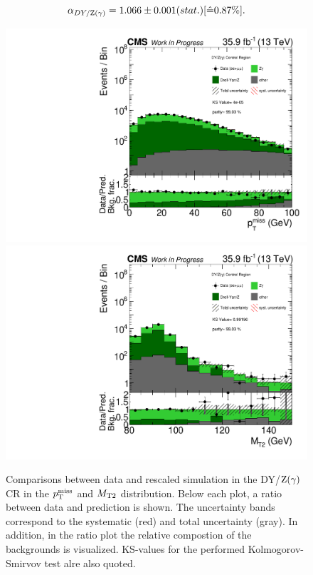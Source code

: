 %
\begin{equation}\label{eq:AlphaDY}
 \alpha_{DY/\mathrm{Z}(\gamma)}=1.066 \pm 0.001 (stat.) [\hat{=}0.87\%].
\end{equation}

\begin{figure}[tbp]
 \centering
 \includegraphics[width=\pairwidth]{figures/plots_CR_dy/CRDY_LL_nom_met_log}
 \includegraphics[width=\pairwidth]{figures/plots_CR_dy/CRDY_LL_nom_mt2_log}
 \caption{Comparisons between data and rescaled simulation in the DY/$\mathrm{Z}(\gamma)$ CR in the $p_{\mathrm{T}}^\text{miss}$ and $M_{\mathrm{T2}}$ distribution. Below each plot, a ratio between data and prediction is shown. The uncertainty bands correspond to the systematic (red) and total uncertainty (gray). In addition, in the ratio plot the relative compostion of the backgrounds is visualized. KS-values for the performed Kolmogorov-Smirvov test alre also quoted.}
 \label{fig:CRDY}
\end{figure}

